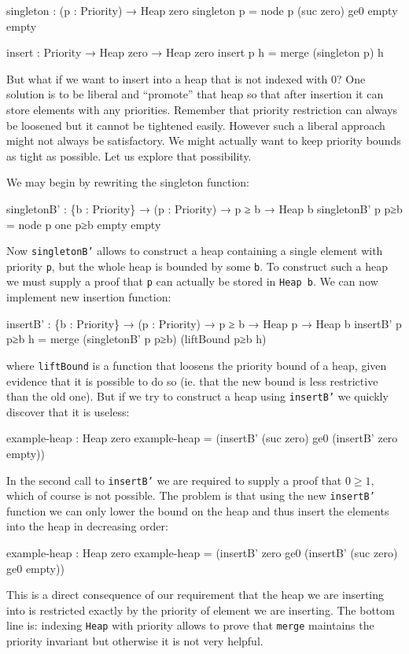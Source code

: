 \begin{code}
singleton : (p : Priority) → Heap zero
singleton p = node p (suc zero) ge0 empty empty

insert : Priority → Heap zero → Heap zero
insert p h = merge (singleton p) h
\end{code}

But what if we want to insert into a heap that is not indexed with 0? One solution is to be liberal and ``promote'' that heap so that after insertion it can store elements with any priorities. Remember that priority restriction can always be loosened but it cannot be tightened easily. However such a liberal approach might not always be satisfactory. We might actually want to keep priority bounds as tight as possible. Let us explore that possibility.

We may begin by rewriting the singleton function:

\begin{code}
singletonB' : \{b : Priority\} → (p : Priority) → p ≥ b → Heap b
singletonB' p p≥b = node p one p≥b empty empty
\end{code}
\noindent
Now \texttt{singletonB'} allows to construct a heap containing a single element with priority \texttt{p}, but the whole heap is bounded by some \texttt{b}. To construct such a heap we must supply a proof that \texttt{p} can actually be stored in \texttt{Heap b}. We can now implement new insertion function:

\begin{small}
\begin{code}
insertB' : \{b : Priority\} → (p : Priority) → p ≥ b → Heap p → Heap b
insertB' p p≥b h = merge (singletonB' p p≥b) (liftBound p≥b h)
\end{code}
\end{small}
\noindent
where \texttt{liftBound} is a function that loosens the priority bound of a heap, given evidence that it is possible to do so (ie. that the new bound is less restrictive than the old one). But if we try to construct a heap using \texttt{insertB'} we quickly discover that it is useless:

\begin{code}
example-heap : Heap zero
example-heap = (insertB' (suc zero) ge0
               (insertB' zero  empty))
\end{code}
\noindent
In the second call to \texttt{insertB'} we are required to supply a proof that $0 \ge 1$, which of course is not possible. The problem is that using the new \texttt{insertB'} function we can only lower the bound on the heap and thus insert the elements into the heap in decreasing order:

\begin{code}
example-heap : Heap zero
example-heap = (insertB' zero ge0
               (insertB' (suc zero) ge0 empty))
\end{code}
\noindent
This is a direct consequence of our requirement that the heap we are inserting into is restricted exactly by the priority of element we are inserting. The bottom line is: indexing \texttt{Heap} with priority allows to prove that \texttt{merge} maintains the priority invariant but otherwise it is not very helpful.